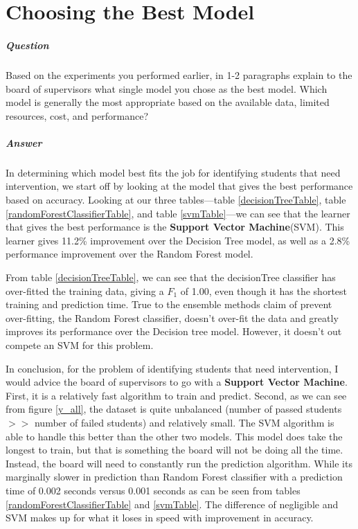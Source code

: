 \documentclass[twoside,openright,titlepage,numbers=noenddot,headinclude,%
               footinclude=true,cleardoublepage=empty,abstractoff,BCOR=5mm,%
               paper=a4,fontsize=11pt,ngerman,american]{scrreprt}
\numberwithin{theorem}{chapter}
\numberwithin{definition}{chapter}
\numberwithin{algorithm}{chapter}
\numberwithin{figure}{chapter}
\numberwithin{table}{chapter}
\numberwithin{equation}{chapter}
\begin{document}

\chapter*{Choosing the Best Model}

\paragraph{\textbf{Question}} Based on the experiments you performed earlier, in 1-2 paragraphs explain to the board of supervisors what single model you chose as the best model. Which model is generally the most appropriate based on the available data, limited resources, cost, and performance?

\paragraph{\textbf{Answer}} In determining which model best fits the job for identifying students that need intervention, we start off by looking at the model that gives the best performance based on accuracy. Looking at our three tables---table \ref{decisionTreeTable}, table \ref{randomForestClassifierTable}, and table \ref{svmTable}---we can see that the learner that gives the best performance is the \textbf{Support Vector Machine}(SVM). This learner gives 11.2\% improvement over the Decision Tree model, as well as a 2.8\% performance improvement over the Random Forest model.

From table \ref{decisionTreeTable}, we can see that the decisionTree classifier has over-fitted the training data, giving a $F_1$ of 1.00, even though it has the shortest training and prediction time. True to the ensemble methods claim of prevent over-fitting, the Random Forest classifier, doesn't over-fit the data and greatly improves its performance over the Decision tree model. However, it doesn't out compete an SVM for this problem.

In conclusion, for the problem of identifying students that need intervention, I would advice the board of supervisors to go with a \textbf{Support Vector Machine}. First, it is a relatively fast algorithm to train and predict. Second, as we can see from figure \ref{y_all}, the dataset is quite unbalanced (number of passed students $>>$ number of failed students) and relatively small. The SVM algorithm is able to handle this better than the other two models. This model does take the longest to train, but that is something the board will not be doing all the time. Instead, the board will need to constantly run the prediction algorithm. While its marginally slower in prediction than Random Forest classifier with a prediction time of 0.002 seconds versus 0.001 seconds as can be seen from tables \ref{randomForestClassifierTable} and \ref{svmTable}. The difference of negligible and SVM makes up for what it loses in speed with improvement in accuracy.
\end{document}
